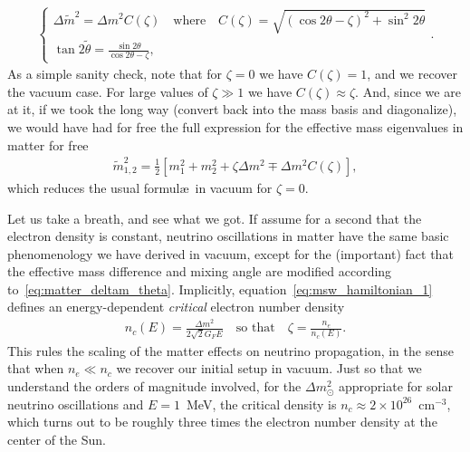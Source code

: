 \begin{align}\label{eq:matter_deltam_theta}
  \begin{cases}
    \Delta \tilde{m}^2 = \Delta m^2 C(\zeta)
    \quad\text{where}\quad
    C(\zeta) = \sqrt{(\cos 2\theta - \zeta)^2 + \sin^2 2\theta}\\[5pt]
    \tan 2\tilde{\theta} = \frac{\sin 2\theta}{\cos 2\theta - \zeta},
  \end{cases}.
\end{align}
As a simple sanity check, note that for $\zeta = 0$ we have $C(\zeta) = 1$, and
we recover the vacuum case. For large values of $\zeta \gg 1$ we have
$C(\zeta) \approx \zeta$.
And, since we are at it, if we took the long way (convert back into the mass
basis and diagonalize), we would have had for free the full expression for the
effective mass eigenvalues in matter for free
\begin{align}
  \tilde{m}^2_{1,2} =
  \frac{1}{2} \left[ m_1^2 + m_2^2 + \zeta \Delta m^2 \mp \Delta m^2 C(\zeta) \right],
\end{align}
which reduces the usual formul\ae\ in vacuum for $\zeta = 0$.

Let us take a breath, and see what we got. If assume for a second that the electron
density is constant, neutrino oscillations in matter have the same basic phenomenology
we have derived in vacuum, except for the (important) fact that the effective mass
difference and mixing angle are modified according to~\eqref{eq:matter_deltam_theta}.
Implicitly, equation~\eqref{eq:msw_hamiltonian_1} defines an energy-dependent
\emph{critical} electron number density
\begin{align*}
  n_c(E) = \frac{\Delta m^2}{2\sqrt{2}G_F E}
  \quad\text{so that}\quad
  \zeta = \frac{n_e}{n_c(E)}.
\end{align*}
This rules the scaling of the matter effects on neutrino propagation, in the sense
that when $n_e \ll n_c$ we recover our initial setup in vacuum. Just so that we
understand the orders of magnitude involved, for the $\Delta m^2_\odot$ appropriate
for solar neutrino oscillations and $E = 1$~MeV, the critical density is
$n_c \approx 2 \times 10^{26}$~cm$^{-3}$, which turns out to be roughly three times
the electron number density at the center of the Sun.


